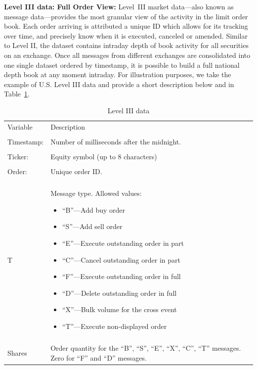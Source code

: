 \noindent\textbf{Level III data: Full Order View:} Level~III market data---also known as message data---provides the most granular view of the activity in the limit order book. Each order arriving is attributed a unique ID which allows for its tracking over time, and precisely know when it is executed, canceled or amended. Similar to Level II, the dataset contains intraday depth of book activity for all securities on an exchange. Once all messages from different exchanges are consolidated into one single dataset ordered by timestamp, it is possible to build a full national depth book at any moment intraday. For illustration purposes, we take the example of U.S. Level III data and provide a short description below and in Table~\ref{tab:level3data}.
	\begin{table}[!ht]
	\centering
	\caption{Level III data \label{tab:level3data}}
	\begin{tabular}{lp{}} \hline
	Variable & Description \\
	& \\
	Timestamp: & Number of milliseconds after the midnight. \\
	& \\
	Ticker: & Equity symbol (up to 8 characters) \\
	& \\
	Order: & Unique order ID. \\
	& \\
	T & Message type. Allowed values: \newline \begin{minipage}[t]{0.6\textwidth} \begin{itemize} \item ``B''---Add buy order \item ``S''---Add sell order \item ``E''---Execute outstanding order in part \item ``C''---Cancel outstanding order in part \item ``F''---Execute outstanding order in full \item ``D''---Delete outstanding order in full \item ``X''---Bulk volume for the cross event \item ``T''---Execute non-displayed order \end{itemize} \end{minipage} \\
	& \\
	Shares & Order quantity for the ``B'', ``S'', ``E'', ``X'', ``C'', ``T'' messages. Zero for ``F'' and ``D'' messages. \\

\end{tabular}
\end{table}
